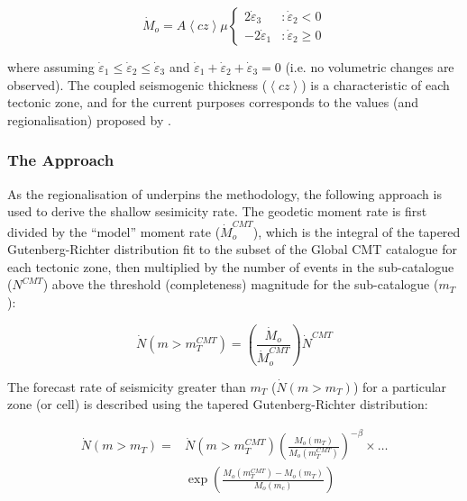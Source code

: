 \begin{equation}
\dot{M}_o = A \left\langle {cz} \right\rangle \mu \left\{\begin{array}{lr}
2\dot{\varepsilon}_3 &:\dot{\varepsilon}_2 < 0\\
-2\dot{\varepsilon}_1&:\dot{\varepsilon}_2 \geq 0
\end{array}\right.
\end{equation}
 
 where assuming $\dot{\varepsilon}_1 \leq \dot{\varepsilon}_2 \leq \dot{\varepsilon}_3$ and $\dot{\varepsilon}_1 + \dot{\varepsilon}_2 + \dot{\varepsilon}_3 = 0$ (i.e. no volumetric changes are observed). The coupled seismogenic thickness ($\left\langle cz \right\rangle$) is a characteristic of each tectonic zone, and for the current purposes corresponds to the values (and regionalisation) proposed by \textcite{BirdKagan2004}. 
 
 \subsubsection{The \textcite{BirdLiu2007} Approach}
 
 As the regionalisation of \textcite{BirdKagan2004} underpins the \textcite{BirdLiu2007} methodology, the following approach is used to derive the shallow sesimicity rate. The geodetic moment rate  is first divided by the ``model'' moment rate ($\dot{M}_o^{CMT}$), which is the integral of the tapered Gutenberg-Richter distribution fit to the subset of the Global CMT catalogue for each tectonic zone, then multiplied by the number of events in the sub-catalogue ($N^{CMT}$) above the threshold (completeness) magnitude for the sub-catalogue ($m_T$):
 
 \begin{equation}
 \dot{N} \left( {m > m_T^{CMT}} \right) = \left( {\frac{\dot{M}_o}{\dot{M}_o^{CMT}}} \right) \dot{N}^{CMT}
 \end{equation}

The forecast rate of seismicity greater than $m_T$ ($\dot{N} \left( {m > m_T} \right)$) for a particular zone (or cell) is described using the tapered Gutenberg-Richter distribution:

\begin{equation}
\begin{split}
\dot{N} \left( {m > m_T} \right) =& \dot{N} \left( {m > m_T^{CMT}} \right) \left( {\frac{M_o \left( {m_T} \right)}{M_o \left( {m_T^{CMT}} \right)}} \right)^{-\beta} \times \ldots \\
& \exp \left( {\frac{M_o \left( {m_T^{CMT}} \right) - M_o \left( {m_T} \right)}{M_o \left( {m_c} \right)}} \right)\end{split}
\end{equation}
 
